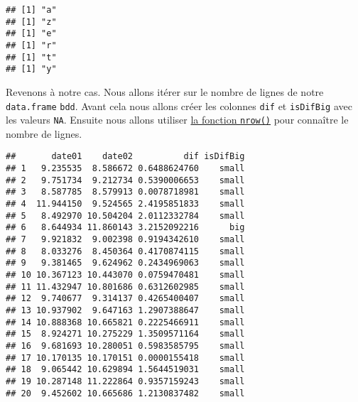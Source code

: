 \documentclass[]{book}
\newenvironment{Shaded}{\begin{snugshade}}{\end{snugshade}}
\newcommand{\KeywordTok}[1]{\textcolor[rgb]{0.13,0.29,0.53}{\textbf{#1}}}
\newcommand{\DataTypeTok}[1]{\textcolor[rgb]{0.13,0.29,0.53}{#1}}
\newcommand{\DecValTok}[1]{\textcolor[rgb]{0.00,0.00,0.81}{#1}}
\newcommand{\StringTok}[1]{\textcolor[rgb]{0.31,0.60,0.02}{#1}}
\newcommand{\OtherTok}[1]{\textcolor[rgb]{0.56,0.35,0.01}{#1}}
\newcommand{\ControlFlowTok}[1]{\textcolor[rgb]{0.13,0.29,0.53}{\textbf{#1}}}
\newcommand{\OperatorTok}[1]{\textcolor[rgb]{0.81,0.36,0.00}{\textbf{#1}}}
\newcommand{\NormalTok}[1]{#1}
\theoremstyle{definition}
\theoremstyle{definition}
\theoremstyle{definition}
\theoremstyle{remark}
\begin{document}
\begin{verbatim}
## [1] "a"
## [1] "z"
## [1] "e"
## [1] "r"
## [1] "t"
## [1] "y"
\end{verbatim}

Revenons à notre cas. Nous allons itérer sur le nombre de lignes de
notre \texttt{data.frame} \texttt{bdd}. Avant cela nous allons créer les
colonnes \texttt{dif} et \texttt{isDifBig} avec les valeurs \texttt{NA}.
Ensuite nous allons utiliser \protect\hyperlink{l015nrow}{la fonction
\texttt{nrow()}} pour connaître le nombre de lignes.

\begin{Shaded}
\end{Shaded}

\begin{verbatim}
##       date01    date02          dif isDifBig
## 1   9.235535  8.586672 0.6488624760    small
## 2   9.751734  9.212734 0.5390006653    small
## 3   8.587785  8.579913 0.0078718981    small
## 4  11.944150  9.524565 2.4195851833    small
## 5   8.492970 10.504204 2.0112332784    small
## 6   8.644934 11.860143 3.2152092216      big
## 7   9.921832  9.002398 0.9194342610    small
## 8   8.033276  8.450364 0.4170874115    small
## 9   9.381465  9.624962 0.2434969063    small
## 10 10.367123 10.443070 0.0759470481    small
## 11 11.432947 10.801686 0.6312602985    small
## 12  9.740677  9.314137 0.4265400407    small
## 13 10.937902  9.647163 1.2907388647    small
## 14 10.888368 10.665821 0.2225466911    small
## 15  8.924271 10.275229 1.3509571164    small
## 16  9.681693 10.280051 0.5983585795    small
## 17 10.170135 10.170151 0.0000155418    small
## 18  9.065442 10.629894 1.5644519031    small
## 19 10.287148 11.222864 0.9357159243    small
## 20  9.452602 10.665686 1.2130837482    small
\end{verbatim}
\end{document}
